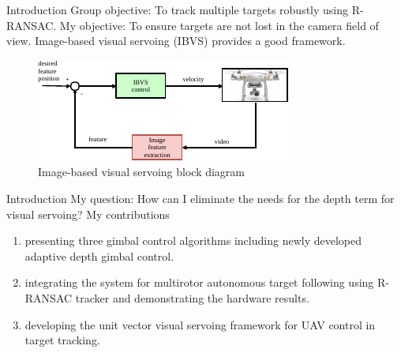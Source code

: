 \documentclass[9pt]{beamer}
\begin{document}
\begin{frame}{Introduction}
Group objective: To track multiple targets robustly using R-RANSAC.
\linebreak
\linebreak
My objective: To ensure targets are not lost in the camera field of view. Image-based visual servoing (IBVS) provides a good framework.
	\begin{figure}
		\includegraphics[scale=1.5]{ibvs.pdf}
		\caption{Image-based visual servoing block diagram}
	\end{figure}
\end{frame}

\begin{frame}{Introduction}
My question: How can I eliminate the needs for the depth term for visual servoing?
\linebreak
\linebreak
My contributions
\begin{enumerate}
	\item presenting three gimbal control algorithms including newly developed adaptive depth gimbal
	control.
	\item integrating the system for multirotor autonomous target following using R-RANSAC
	tracker and demonstrating the hardware results.
	\item developing the unit vector visual servoing framework for UAV control in target tracking.
\end{enumerate}
\end{frame}
\end{document}
